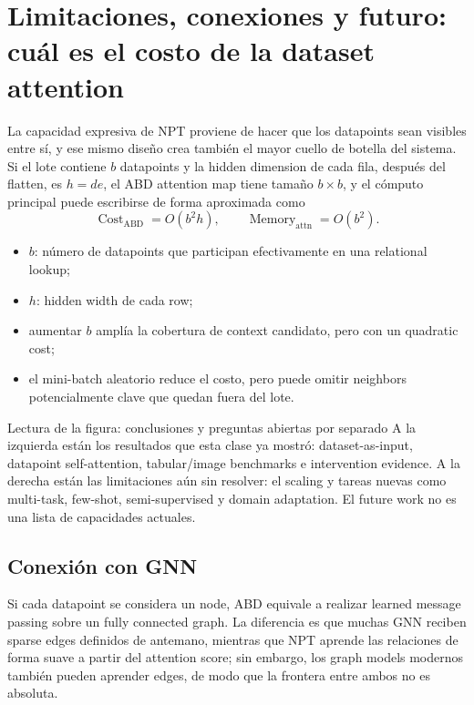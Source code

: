 \section{Limitaciones, conexiones y futuro: cuál es el costo de la dataset attention}

La capacidad expresiva de NPT proviene de hacer que los datapoints sean visibles entre sí, y ese mismo diseño crea también el mayor cuello de botella del sistema. Si el lote contiene $b$ datapoints y la hidden dimension de cada fila, después del flatten, es $h=de$, el ABD attention map tiene tamaño $b\times b$, y el cómputo principal puede escribirse de forma aproximada como
\[
\operatorname{Cost}_{\mathrm{ABD}}=O(b^2h),
\qquad
\operatorname{Memory}_{\mathrm{attn}}=O(b^2).
\]

\begin{itemize}
  \item $b$: número de datapoints que participan efectivamente en una relational lookup;
  \item $h$: hidden width de cada row;
  \item aumentar $b$ amplía la cobertura de context candidato, pero con un quadratic cost;
  \item el mini-batch aleatorio reduce el costo, pero puede omitir neighbors potencialmente clave que quedan fuera del lote.
\end{itemize}


\begin{knowledgebox}{Lectura de la figura: conclusiones y preguntas abiertas por separado}
A la izquierda están los resultados que esta clase ya mostró: dataset-as-input, datapoint self-attention, tabular/image benchmarks e intervention evidence. A la derecha están las limitaciones aún sin resolver: el scaling y tareas nuevas como multi-task, few-shot, semi-supervised y domain adaptation. El future work no es una lista de capacidades actuales.
\end{knowledgebox}

\subsection{Conexión con GNN}

Si cada datapoint se considera un node, ABD equivale a realizar learned message passing sobre un fully connected graph. La diferencia es que muchas GNN reciben sparse edges definidos de antemano, mientras que NPT aprende las relaciones de forma suave a partir del attention score; sin embargo, los graph models modernos también pueden aprender edges, de modo que la frontera entre ambos no es absoluta.

